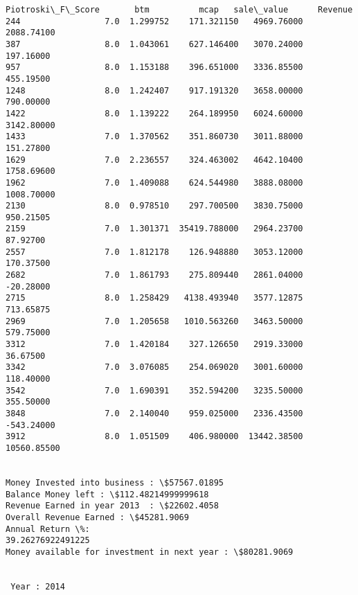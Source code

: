 \documentclass[11pt]{article}
\begin{document}
\begin{Verbatim}[commandchars=\\\{\}]
      Piotroski\_F\_Score       btm          mcap   sale\_value      Revenue
244                 7.0  1.299752    171.321150   4969.76000   2088.74100
387                 8.0  1.043061    627.146400   3070.24000    197.16000
957                 8.0  1.153188    396.651000   3336.85500    455.19500
1248                8.0  1.242407    917.191320   3658.00000    790.00000
1422                8.0  1.139222    264.189950   6024.60000   3142.80000
1433                7.0  1.370562    351.860730   3011.88000    151.27800
1629                7.0  2.236557    324.463002   4642.10400   1758.69600
1962                7.0  1.409088    624.544980   3888.08000   1008.70000
2130                8.0  0.978510    297.700500   3830.75000    950.21505
2159                7.0  1.301371  35419.788000   2964.23700     87.92700
2557                7.0  1.812178    126.948880   3053.12000    170.37500
2682                7.0  1.861793    275.809440   2861.04000    -20.28000
2715                8.0  1.258429   4138.493940   3577.12875    713.65875
2969                7.0  1.205658   1010.563260   3463.50000    579.75000
3312                7.0  1.420184    327.126650   2919.33000     36.67500
3342                7.0  3.076085    254.069020   3001.60000    118.40000
3542                7.0  1.690391    352.594200   3235.50000    355.50000
3848                7.0  2.140040    959.025000   2336.43500   -543.24000
3912                8.0  1.051509    406.980000  13442.38500  10560.85500


Money Invested into business : \$57567.01895
Balance Money left : \$112.48214999999618
Revenue Earned in year 2013  : \$22602.4058
Overall Revenue Earned : \$45281.9069
Annual Return \%:
39.26276922491225
Money available for investment in next year : \$80281.9069


 Year : 2014


\end{Verbatim}
\end{document}

